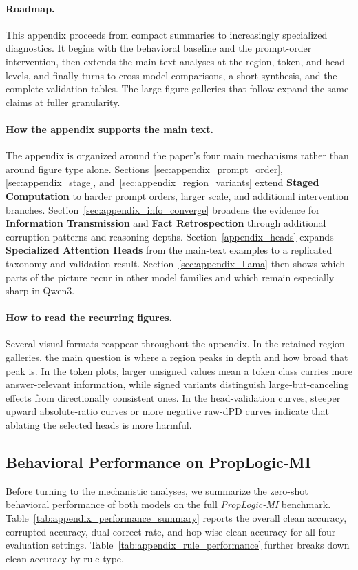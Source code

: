 \documentclass[11pt]{article}
\begin{document}
\paragraph{Roadmap.}
This appendix proceeds from compact summaries to increasingly specialized diagnostics. It begins with the behavioral baseline and the prompt-order intervention, then extends the main-text analyses at the region, token, and head levels, and finally turns to cross-model comparisons, a short synthesis, and the complete validation tables. The large figure galleries that follow expand the same claims at fuller granularity.

\paragraph{How the appendix supports the main text.}
The appendix is organized around the paper's four main mechanisms rather than around figure type alone. Sections~\ref{sec:appendix_prompt_order}, \ref{sec:appendix_stage}, and~\ref{sec:appendix_region_variants} extend \textbf{Staged Computation} to harder prompt orders, larger scale, and additional intervention branches. Section~\ref{sec:appendix_info_converge} broadens the evidence for \textbf{Information Transmission} and \textbf{Fact Retrospection} through additional corruption patterns and reasoning depths. Section~\ref{appendix_heads} expands \textbf{Specialized Attention Heads} from the main-text examples to a replicated taxonomy-and-validation result. Section~\ref{sec:appendix_llama} then shows which parts of the picture recur in other model families and which remain especially sharp in Qwen3.

\paragraph{How to read the recurring figures.}
Several visual formats reappear throughout the appendix. In the retained region galleries, the main question is where a region peaks in depth and how broad that peak is. In the token plots, larger unsigned values mean a token class carries more answer-relevant information, while signed variants distinguish large-but-canceling effects from directionally consistent ones. In the head-validation curves, steeper upward absolute-ratio curves or more negative raw-dPD curves indicate that ablating the selected heads is more harmful.

\subsection{Behavioral Performance on PropLogic-MI}
\label{sec:appendix_performance}
Before turning to the mechanistic analyses, we summarize the zero-shot behavioral performance of both models on the full \textit{PropLogic-MI} benchmark. Table~\ref{tab:appendix_performance_summary} reports the overall clean accuracy, corrupted accuracy, dual-correct rate, and hop-wise clean accuracy for all four evaluation settings. Table~\ref{tab:appendix_rule_performance} further breaks down clean accuracy by rule type.
\end{document}
